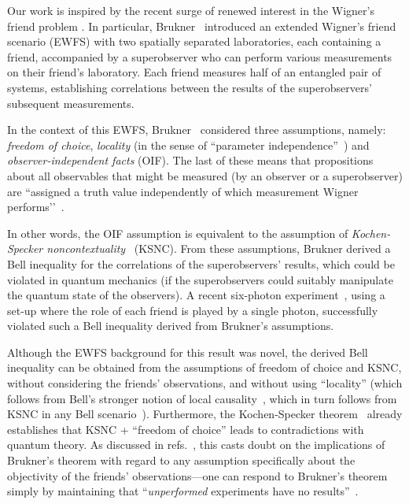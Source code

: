 \documentclass[aps,prx,twocolumn,superscriptaddress]{revtex4-1}
\theoremstyle{plain}
\begin{document}
Our work is inspired by the recent surge of renewed interest in the Wigner's friend problem \cite{BruknerLF,BruknerBook, FR, Proietti2019,Formalisms,Healey2018,BruknerComment}. In particular, Brukner~\cite{BruknerLF} introduced an extended Wigner's friend scenario (EWFS) with two spatially separated laboratories, each containing a friend, accompanied by a superobserver who can perform various measurements on their friend's laboratory. Each friend measures half of an entangled pair of systems, establishing correlations between the results of the superobservers' subsequent measurements. 

In the context of this EWFS, Brukner~\cite{BruknerLF,BruknerBook,BruknerComment} considered three assumptions, namely: \textit{{freedom of choice}}, \textit{{locality}} (in the sense of ``parameter independence''~\cite{Shimony1984}) and \textit{{observer-independent facts}} (OIF). The last of these means that propositions about all observables that might be measured (by an observer or a superobserver) are ``assigned a truth value independently of which measurement Wigner performs’’~\cite{BruknerLF}. 

In other words, the OIF assumption is equivalent to the assumption of {\em Kochen-Specker noncontextuality}~\cite{KS1967, Liang2011} ({KSNC}). From these assumptions, Brukner derived a Bell inequality for the correlations of the superobservers' results, which could be violated in quantum mechanics (if the superobservers could suitably manipulate the quantum state of the observers). A recent six-photon experiment~\cite{Proietti2019}, using a set-up where the role of each friend is played by a single photon, successfully violated such a Bell inequality derived from Brukner's assumptions.

Although the EWFS background for this result was novel, the derived Bell inequality can be obtained from the assumptions of {freedom of choice} and {KSNC}, without considering the friends' observations, and without using ``{locality}'' (which follows from Bell's stronger notion of {local causality}~\cite{Causarum}, which in turn follows from {KSNC} in any Bell scenario~\cite{Cavalcanti2018}). Furthermore, the Kochen-Specker theorem~\cite{KS1967} already establishes that KSNC + ``{freedom of choice}'' leads to contradictions with quantum theory. As discussed in refs.~\cite{Healey2018,BruknerComment,HealeyReply}, this casts doubt on the implications of Brukner's theorem with regard to any assumption specifically about the objectivity of the friends’ observations---one can respond to Brukner's theorem simply by maintaining that ``\emph{unperformed} experiments have no results''~\cite{Peres1978}. 
\end{document}

